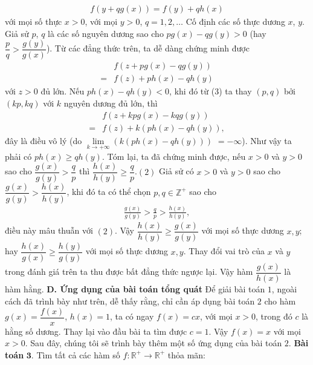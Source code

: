 \begin{multicols}{2}
	\begin{align*}
		f(y + qg(x)) = f(y) + qh(x)
	\end{align*}
	với mọi số thực $x>0 $, với mọi $y>0$, $ q = 1,2, \ldots $
	\vskip 0.1cm
	Cố định các số thực dương $x$, $y$.
	Giả sử $p$, $q$ là các số nguyên dương  sao cho $p g(x)-q g(y)>0$ (hay $\dfrac{p}{q} > \dfrac{{g(y)}}{{g(x)}}$). Từ các đẳng thức trên, ta dễ dàng chứng minh được
	\begin{align*}
		&f(z+p g(x)-q g(y))\\
		=&f(z)+p h(x)-q h(y)\tag{$3$}
	\end{align*}
	với $z>0$ đủ lớn. Nếu $p h(x)-q h(y)<0$, khi đó từ ($3$) ta thay $(p, q)$ bởi $(k p, k q)$ với $k$ nguyên dương đủ lớn, thì
	\begin{align*}
		&f(z + kpg(x) - kqg(y)) \\
		= &f(z) + k\left( {ph(x) - qh(y)} \right),
	\end{align*}
	đây là điều vô lý (do $\mathop {\lim }\limits_{k \to  + \infty }\!\! \left( k\left( {ph(x) \!-\! qh(y)} \right)\right)$ \linebreak$=  - \infty $). 
	Như vậy ta phải có $p h(x)\ge q h(y) $.
	Tóm lại, ta đã chứng minh được, nếu $x>0$ và $y>0$ sao cho 
	$\dfrac{g(x)}{g(y)}>\dfrac{q}{p}$ thì
	$\dfrac{h(x)}{h(y)} \geq \dfrac{q}{p}$.\hfill$(2)$
	\vskip 0.1cm
	Giả sử có $x>0$ và $y>0$ sao cho  $\dfrac{g(x)}{g(y)}>\dfrac{h(x)}{h(y)}$, khi đó ta có thể chọn $p, q \in \mathbb{Z}^{+}$ sao cho
	\begin{align*}
		\frac{g(x)}{g(y)}>\frac{q}{p}>\frac{h(x)}{h(y)},
	\end{align*}
	điều này mâu thuẫn với $(2)$. Vậy $\dfrac{h(x)}{h(y)} \geq \dfrac{g(x)}{g(y)}$ với mọi số thực dương $ x, y$;  hay
	$
	\dfrac{h(x)}{g(x)} \geq \dfrac{h(y)}{g(y)}$ với mọi số thực dương $ x, y$.
	Thay đổi vai trò của $x$ và $y$ trong đánh giá trên ta thu được bất đẳng thức ngược lại.
	Vậy hàm $\dfrac{g(x)}{h(x)}$ là hàm hằng.
	\vskip 0.1cm
	\textbf{\color{hoccungpi}D. Ứng dụng của bài toán tổng quát}
	\vskip 0.1cm
	Để giải bài toán $1$, ngoài cách đã trình bày như trên, dễ thấy rằng, chỉ cần áp dụng  bài toán $2$ cho hàm 
	$g(x)=\dfrac{f(x)}{x}$, $h(x)=1$,
	ta có ngay $f(x)=c x$, với mọi $x>0$, trong đó $c$ là hằng số dương. Thay lại vào đầu bài ta tìm được $c=1$.
	Vậy $f(x)=x$ với mọi $ x>0$.
	\vskip 0.1cm
	Sau đây, chúng tôi sẽ trình bày thêm một số ứng dụng của bài toán $2$.
	\vskip 0.1cm
	\textbf{\color{hoccungpi}Bài toán} $\pmb{3.}$
	Tìm tất cả các hàm số $f:\mathbb{R^+}  \to \mathbb{R^+} $ thỏa mãn:
	\begin{align*}

\end{align*}
\end{multicols}
